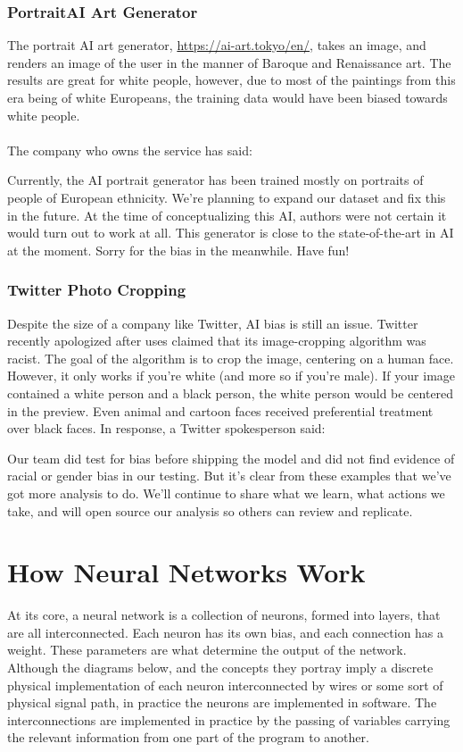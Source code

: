 \documentclass[titlepage]{article}
\begin{document}
\subsubsection{PortraitAI Art Generator}
The portrait AI art generator, \url{https://ai-art.tokyo/en/}, takes an image, and renders an image of the user in the manner of Baroque and Renaissance art. The results are great for white people, however, due to most of the paintings from this era being of white Europeans, the training data would have been biased towards white people.
\\\\
The company who owns the service has said:
\begin{quoting}
    Currently, the AI portrait generator has been trained mostly on portraits of people of European ethnicity. We're planning to expand our dataset and fix this in the future. At the time of conceptualizing this AI, authors were not certain it would turn out to work at all. This generator is close to the state-of-the-art in AI at the moment. Sorry for the bias in the meanwhile. Have fun!
\end{quoting}

\subsubsection{Twitter Photo Cropping}
Despite the size of a company like Twitter, AI bias is still an issue. Twitter recently apologized after uses claimed that its image-cropping algorithm was racist. The goal of the algorithm is to crop the image, centering on a human face. However, it only works if you're white (and more so if you're male). If your image contained a white person and a black person, the white person would be centered in the preview. Even animal and cartoon faces received preferential treatment over black faces. In response, a Twitter spokesperson said:
\begin{quoting}
    Our team did test for bias before shipping the model and did not find evidence of racial or gender bias in our testing. But it's clear from these examples that we've got more analysis to do. We'll continue to share what we learn, what actions we take, and will open source our analysis so others can review and replicate.
\end{quoting}
\newpage
\section{How Neural Networks Work}
At its core, a neural network is a collection of neurons, formed into layers, that are all interconnected. Each neuron has its own bias, and each connection has a weight. These parameters are what determine the output of the network. Although the diagrams below, and the concepts they portray imply a discrete physical implementation of each neuron interconnected by wires or some sort of physical signal path, in practice the neurons are implemented in software. The interconnections are implemented in practice by the passing of variables carrying the relevant information from one part of the program to another.
\end{document}
